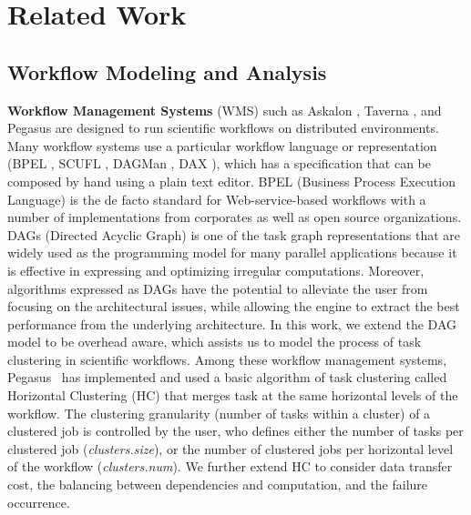 \chapter{Related Work}
\label{chap:related}

\section{Workflow Modeling and Analysis}

\textbf{Workflow Management Systems} (WMS) such as Askalon \cite{Wieczorek2005}, Taverna \cite{Oinn2004}, and Pegasus \cite{Deelman2004} are designed to run scientific workflows on distributed environments. Many workflow systems use a particular workflow language or representation (BPEL \cite{BPEL}, SCUFL \cite{Oinn2004}, DAGMan \cite{Kalayci2010}, DAX \cite{Deelman2005}), which has a specification that can be composed by hand using a plain text editor. BPEL (Business Process Execution Language) \cite{BPEL} is the de facto standard for Web-service-based workflows with a number of implementations from corporates as well as open source organizations. DAGs (Directed Acyclic Graph) \cite{Deelman2005} is one of the task graph representations that are widely used as the programming model for many parallel applications because it is effective in expressing and optimizing irregular computations. Moreover, algorithms expressed as DAGs have the potential to alleviate the user from focusing on the architectural issues, while allowing the engine to extract the best performance from the underlying architecture. In this work, we extend the DAG model to be overhead aware, which assists us to model the process of task clustering in scientific workflows. 
Among these workflow management systems, Pegasus~\cite{Singh2008} has implemented and used a basic algorithm of task clustering called Horizontal Clustering (HC) that merges task at the same horizontal levels of the workflow. The clustering granularity (number of tasks within a cluster) of a clustered job is controlled by the user, who defines either the number of tasks per clustered job (\emph{clusters.size}), or the number of clustered jobs per horizontal level of the workflow (\emph{clusters.num}). We further extend HC to consider data transfer cost, the balancing between dependencies and computation, and the failure occurrence. 




